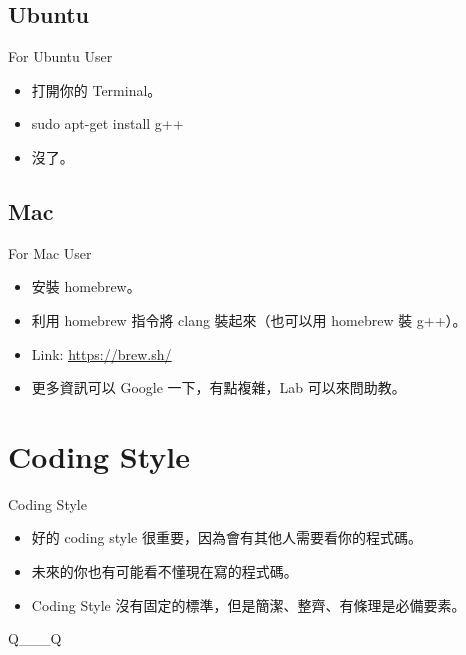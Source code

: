 \documentclass[t]{beamer}
\begin{document}
\subsection{Ubuntu}
\begin{frame}{For Ubuntu User}
  \begin{itemize}
    \item 打開你的 Terminal。
    \item sudo apt-get install g++
    \item 沒了。
  \end{itemize}
\end{frame}

\subsection{Mac}
\begin{frame}{For Mac User}
  \begin{itemize}
    \item 安裝 homebrew。
    \item 利用 homebrew 指令將 clang 裝起來（也可以用 homebrew 裝 g++）。
    \item Link: \href{https://brew.sh/}{\underline{https://brew.sh/}}
    \item 更多資訊可以 Google 一下，有點複雜，Lab 可以來問助教。
  \end{itemize}
\end{frame}

\section{Coding Style}
\begin{frame}{Coding Style}
  \begin{itemize}
    \item 好的 coding style 很重要，因為會有其他人需要看你的程式碼。
    \item 未來的你也有可能看不懂現在寫的程式碼。
    \item Coding Style 沒有固定的標準，但是簡潔、整齊、有條理是必備要素。
  \end{itemize}
\end{frame}

\begin{frame}{Q\_\_\_Q}
  \begin{minipage}[t]{.40\textwidth}
    
  \end{minipage}
  \begin{minipage}[t]{.50\textwidth}
    
  \end{minipage}
\end{frame}
\end{document}
